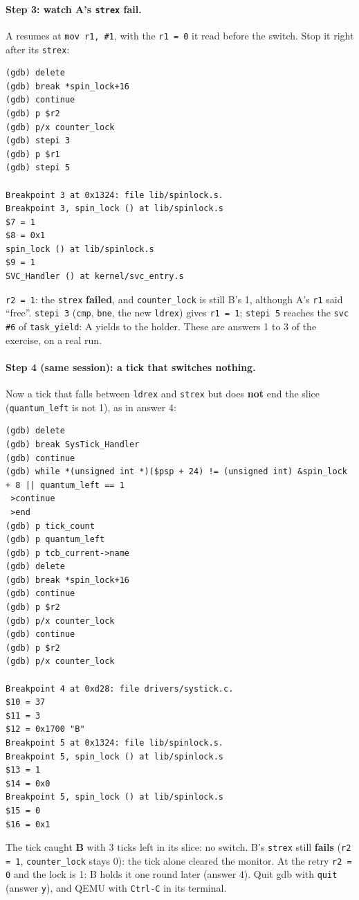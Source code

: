 \paragraph{Step 3: watch A's \texttt{strex} fail.} A resumes at \texttt{mov r1, \#1}, with the \texttt{r1 = 0} it read before the switch. Stop it right after its \texttt{strex}:
{\verbatimscriptsize
\begin{verbatim}
(gdb) delete
(gdb) break *spin_lock+16
(gdb) continue
(gdb) p $r2
(gdb) p/x counter_lock
(gdb) stepi 3
(gdb) p $r1
(gdb) stepi 5

Breakpoint 3 at 0x1324: file lib/spinlock.s.
Breakpoint 3, spin_lock () at lib/spinlock.s
$7 = 1
$8 = 0x1
spin_lock () at lib/spinlock.s
$9 = 1
SVC_Handler () at kernel/svc_entry.s
\end{verbatim}}
\texttt{r2 = 1}: the \texttt{strex} \textbf{failed}, and \texttt{counter\_lock} is still B's 1, although A's \texttt{r1} said ``free''. \texttt{stepi 3} (\texttt{cmp}, \texttt{bne}, the new \texttt{ldrex}) gives \texttt{r1 = 1}; \texttt{stepi 5} reaches the \texttt{svc \#6} of \texttt{task\_yield}: A yields to the holder. These are answers 1 to 3 of the exercise, on a real run.

\paragraph{Step 4 (same session): a tick that switches nothing.} Now a tick that falls between \texttt{ldrex} and \texttt{strex} but does \textbf{not} end the slice (\texttt{quantum\_left} is not 1), as in answer 4:
{\verbatimscriptsize
\begin{verbatim}
(gdb) delete
(gdb) break SysTick_Handler
(gdb) continue
(gdb) while *(unsigned int *)($psp + 24) != (unsigned int) &spin_lock + 8 || quantum_left == 1
 >continue
 >end
(gdb) p tick_count
(gdb) p quantum_left
(gdb) p tcb_current->name
(gdb) delete
(gdb) break *spin_lock+16
(gdb) continue
(gdb) p $r2
(gdb) p/x counter_lock
(gdb) continue
(gdb) p $r2
(gdb) p/x counter_lock

Breakpoint 4 at 0xd28: file drivers/systick.c.
$10 = 37
$11 = 3
$12 = 0x1700 "B"
Breakpoint 5 at 0x1324: file lib/spinlock.s.
Breakpoint 5, spin_lock () at lib/spinlock.s
$13 = 1
$14 = 0x0
Breakpoint 5, spin_lock () at lib/spinlock.s
$15 = 0
$16 = 0x1
\end{verbatim}}
The tick caught \textbf{B} with 3 ticks left in its slice: no switch. B's \texttt{strex} still \textbf{fails} (\texttt{r2 = 1}, \texttt{counter\_lock} stays 0): the tick alone cleared the monitor. At the retry \texttt{r2 = 0} and the lock is 1: B holds it one round later (answer 4). Quit gdb with \texttt{quit} (answer \texttt{y}), and QEMU with \texttt{Ctrl-C} in its terminal.


